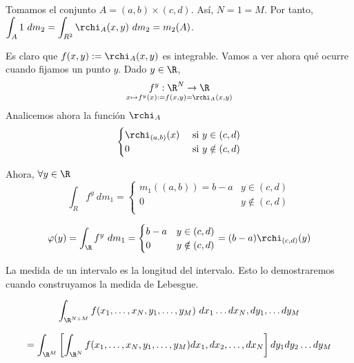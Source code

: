 \begin{ejemplo}
  Tomamos el conjunto $A = (a, b) \times (c, d)$. Así, $N = 1 = M$. Por tanto,
  $\displaystyle \int_A 1 \ dm_2 = \int_{R^2} \rchi_A (x, y) \ dm_2 = m_2(A)$.

  Es claro que $f(x, y) := \rchi_A(x,y)$ es integrable. Vamos a ver ahora qué
  ocurre cuando fijamos un punto $y$. Dado $y \in \R$, $$\underset{x \mapsto f^y(x)
      := f(x, y) = \rchi_A(x,y)}{f^y: \R^N \rightarrow \R}$$
  Analicemos ahora la función $\rchi_A$
  $$\begin{cases}
    \rchi_{(a,b)}(x) & \text{ si } y \in (c,d) \\
    0 & \text{ si } y \notin (c,d) \\
  \end{cases}$$

  Ahora, $\forall y \in \R$ $$\int_R f^y \ dm_1 = \begin{cases}
    m_1 ((a,b)) = b - a & y \in (c, d) \\
    0 & y \notin (c, d) \\
  \end{cases}$$

  \[\varphi(y) = \int_{\R} f^y \ dm_1 = \begin{cases}
    b - a & y \in (c, d) \\
    0 & y \notin (c, d) \\
  \end{cases} = (b -a) \rchi_{(c, d)} (y)\]

\end{ejemplo}

\begin{nota}
  La medida de un intervalo es la longitud del intervalo. Esto lo demostraremos cuando construyamos la medida de Lebesgue.
\end{nota}



\begin{nprop}
  $$\int_{\R^{N+M}} f(x_1, \hdots, x_N, y_1, \hdots, y_M) \ dx_1 \hdots dx_N,
  dy_1, \hdots dy_M$$

  $$= \int_{\R^M} \left[ \int_{\R^N} f(x_1, \hdots, x_N, y_1,
    \hdots, y_M) dx_1, dx_2, \hdots, dx_N \right] dy_1 dy_2 \hdots dy_M$$
\end{nprop}

